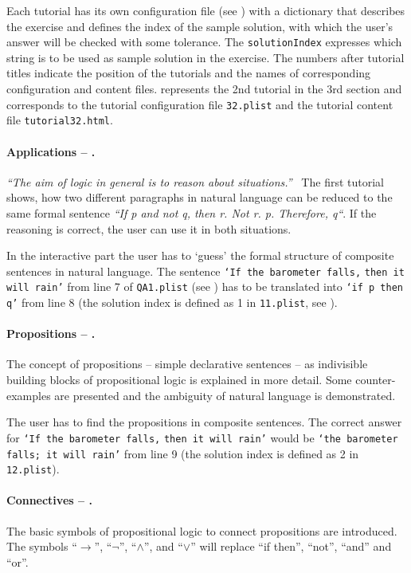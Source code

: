 Each tutorial has its own configuration file 
(see )
with a dictionary that
describes the exercise and defines the index of the sample solution,
with which the user's answer will be checked with some tolerance.
The \verb+solutionIndex+ expresses which string 
is to be used as sample solution in the exercise.
The numbers after tutorial titles indicate the position of the tutorials 
and the names of corresponding configuration and content files.
 represents the 2nd tutorial in the 3rd section and corresponds 
to the tutorial configuration file \verb+32.plist+ and the tutorial content file \verb+tutorial32.html+.

\paragraph{Applications – .}
\label{tut:11}
{\em{}“The aim of logic in general is to reason about situations.”}\ \cite{Huth:2004:LCS:975331} 
The first tutorial shows, how two different paragraphs in natural language 
can be reduced to the same formal sentence {\em“If p and not q, then r. Not r. p. Therefore, q“}. 
If the reasoning is correct, the user can use it in both situations. 

In the interactive part the user has to ‘guess’ the formal structure of composite sentences in natural language. 
The sentence 
\verb+‘If the barometer falls,+ \verb+then it will rain’+ 
from line 7 of \verb+QA1.plist+ (see )
has to be translated into
\verb+‘if p then q’+ from line 8 (the solution index is defined as 1 in \verb+11.plist+, see ).

\paragraph{Propositions – .}
\label{tut:12}

The concept of propositions – simple declarative sentences – 
as indivisible building blocks of propositional logic 
is explained in more detail. Some counter-examples are presented 
and the ambiguity of natural language is demonstrated.

The user has to find the propositions in composite sentences. 
The correct answer for 
\verb+‘If the barometer falls,+ \verb+then it will rain’+ 
would be  
\verb+‘the barometer falls; it will rain’+ 
from line 9 
(the solution index is defined as 2 in \verb+12.plist+).


\paragraph{Connectives – .}
\label{tut:13}
The basic symbols of propositional logic to connect propositions are introduced. 
The symbols “$\rightarrow$”, “$\neg$”, “$\wedge$”, and “$\vee$”
 will replace “if then”, “not”, “and” and “or”. 

